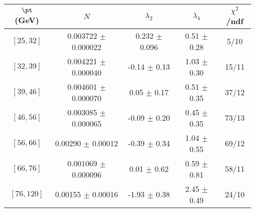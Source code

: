 \begin{tabular}{c||c|c|c|c}
$\pt$ (GeV) & $N$ & $\lambda_{2}$ & $\lambda_4$  & $\chi^2$/ndf  \\
\hline
$[25, 32]$ & 0.003722 $\pm$ 0.000022 & 0.232 $\pm$ 0.096 & 0.51 $\pm$ 0.28 & 5/10\\
$[32, 39]$ & 0.004221 $\pm$ 0.000040 & -0.14 $\pm$ 0.13 & 1.03 $\pm$ 0.30 & 15/11\\
$[39, 46]$ & 0.004601 $\pm$ 0.000070 & 0.05 $\pm$ 0.17 & 0.51 $\pm$ 0.35 & 37/12\\
$[46, 56]$ & 0.003085 $\pm$ 0.000065 & -0.09 $\pm$ 0.20 & 0.45 $\pm$ 0.35 & 73/13\\
$[56, 66]$ & 0.00290 $\pm$ 0.00012 & -0.39 $\pm$ 0.34 & 1.04 $\pm$ 0.55 & 69/12\\
$[66, 76]$ & 0.001069 $\pm$ 0.000096 & 0.01 $\pm$ 0.62 & 0.59 $\pm$ 0.81 & 58/11\\
$[76, 120]$ & 0.00155 $\pm$ 0.00016 & -1.93 $\pm$ 0.38 & 2.45 $\pm$ 0.49 & 24/10\\
\end{tabular}
